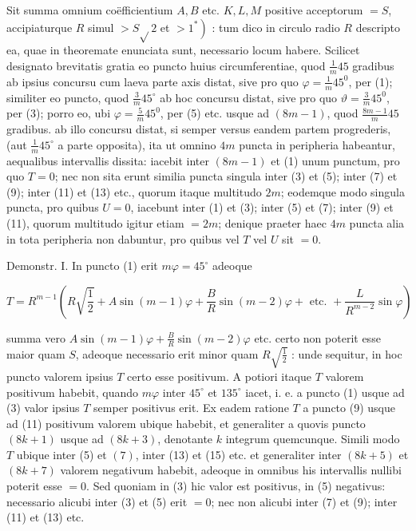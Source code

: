 \documentclass[10pt]{article}
\begin{document}
Sit summa omnium coëfficientium \(A, B\) etc. \(K, L, M\) positive acceptorum \(=S\), accipiaturque \(R\) simul \(>S \sqrt{ } 2\) et \(\left.>1^{*}\right)\) : tum dico in circulo radio \(R\) descripto ea, quae in theoremate enunciata sunt, necessario locum habere. Scilicet designato brevitatis gratia eo puncto huius circumferentiae, quod \(\frac{1}{m} 45\) gradibus ab ipsius concursu cum laeva parte axis distat, sive pro quo \(\varphi=\frac{1}{m} 45^{0}\), per (1); similiter eo puncto, quod \(\frac{3}{m} 45^{\circ}\) ab hoc concursu distat, sive pro quo \(\vartheta=\frac{3}{m} 45^{0}\), per (3); porro eo, ubi \(\varphi=\frac{5}{m} 45^{0}\), per (5) etc. usque ad \((8 m-1)\), quod \(\frac{8 m-1}{m} 45\) gradibus. ab illo concursu distat, si semper versus eandem partem progrederis, (aut \(\frac{1}{m} 45^{\circ}\) a parte opposita), ita ut omnino \(4 m\) puncta in peripheria habeantur, aequalibus intervallis dissita: iacebit inter \((8 m-1)\) et (1) unum punctum, pro quo \(T=0\); nec non sita erunt similia puncta singula inter (3) et (5); inter (7) et (9); inter (11) et (13) etc., quorum itaque multitudo \(2 m\); eodemque modo singula puncta, pro quibus \(U=0\), iacebunt inter (1) et (3); inter (5) et (7); inter (9) et (11), quorum multitudo igitur etiam \(=2 m\); denique praeter haec \(4 m\) puncta alia in tota peripheria non dabuntur, pro quibus vel \(T\) vel \(U\) sit \(=0\).

Demonstr. I. In puncto (1) erit \(m \varphi=45^{\circ}\) adeoque

\[
T=R^{m-1}\left(R \sqrt{\frac{1}{2}}+A \sin (m-1) \varphi+\frac{B}{R} \sin (m-2) \varphi+\text { etc. }+\frac{L}{R^{m-2}} \sin \varphi\right)
\]

summa vero \(A \sin (m-1) \varphi+\frac{B}{R} \sin (m-2) \varphi\) etc. certo non poterit esse maior quam \(S\), adeoque necessario erit minor quam \(R \sqrt{\frac{1}{2}}\) : unde sequitur, in hoc puncto valorem ipsius \(T\) certo esse positivum. A potiori itaque \(T\) valorem positivum habebit, quando \(m \varphi\) inter \(45^{\circ}\) et \(135^{\circ}\) iacet, i. e. a puncto (1) usque ad (3) valor ipsius \(T\) semper positivus erit. Ex eadem ratione \(T\) a puncto (9) usque ad (11) positivum valorem ubique habebit, et generaliter a quovis puncto \((8 k+1)\) usque ad \((8 k+3)\), denotante \(k\) integrum quemcunque. Simili modo \(T\) ubique inter (5) et \((7)\), inter (13) et (15) etc. et generaliter inter \((8 k+5)\) et \((8 k+7)\) valorem negativum habebit, adeoque in omnibus his intervallis nullibi poterit esse \(=0\). Sed quoniam in (3) hic valor est positivus, in (5) negativus: necessario alicubi inter (3) et (5) erit \(=0\); nec non alicubi inter (7) et (9); inter (11) et (13) etc.
\end{document}

